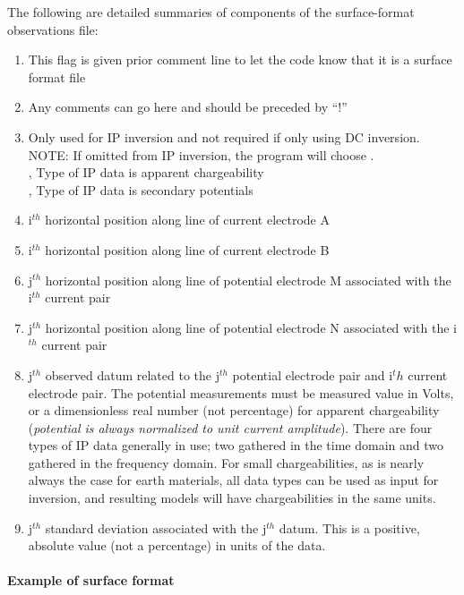 The following are detailed summaries of components of the surface-format observations file:
\begin{enumerate}
\item[\codeName{COMMON\_CURRENT}] This flag is given prior comment line to let the code know that it is a surface format file
\item[\codeName{! Comment Line}] Any comments can go here and should be preceded by ``!''
\item[\codeName{IPTYPE}] Only used for IP inversion and not required if only using DC inversion. NOTE: If omitted from IP inversion, the program will choose . \\
     , Type of IP data is apparent chargeability \\
		 , Type of IP data is secondary potentials
%
\item[\codeName{A$_i^x$}] i$^{th}$ horizontal position along line of current electrode A
\item[\codeName{B$_i^x$}] i$^{th}$ horizontal position along line of current electrode B
\item[\codeName{M$_j^x$}] j$^{th}$ horizontal position along line of potential electrode M associated with the i$^{th}$ current pair
\item[\codeName{N$_j^x$}] j$^{th}$ horizontal position along line of potential electrode N associated with the i$^{th}$ current pair
\item[\codeName{val$_j$}] j$^{th}$  observed datum related to the j$^{th}$ potential electrode pair and i${^th}$ current electrode pair.  The potential measurements must be measured value in Volts, or a dimensionless real number (not percentage) for apparent chargeability (\textit{potential is always normalized to unit current amplitude}). There are four types of IP data generally in use; two gathered in the time domain and two gathered in the frequency domain. For small chargeabilities, as is nearly always the case for earth materials, all data types can be used as input for inversion, and resulting models will have chargeabilities in the same units.
\item[\codeName{stn$_j$}] j$^{th}$ standard deviation associated with the j$^{th}$ datum. This is a positive, absolute value (not a percentage) in units of the data.
\end{enumerate}

\paragraph{Example of surface format} 

